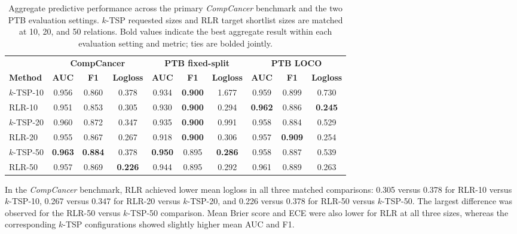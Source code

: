 \documentclass[preprint,12pt,a4paper]{elsarticle}
\begin{document}
\begin{table}[t]
\centering
\caption{Aggregate predictive performance across the primary \emph{CompCancer} benchmark and the two PTB evaluation settings. $k$-TSP requested sizes and RLR target shortlist sizes are matched at 10, 20, and 50 relations. Bold values indicate the best aggregate result within each evaluation setting and metric; ties are bolded jointly.}
\label{tab:world_performance}
\small
\setlength{\tabcolsep}{4pt}
\begin{adjustbox}{max width=\linewidth}
\begin{tabular}{lccc|ccc|ccc}
\toprule
& \multicolumn{3}{c|}{\textbf{CompCancer}}
& \multicolumn{3}{c|}{\textbf{PTB fixed-split}}
& \multicolumn{3}{c}{\textbf{PTB LOCO}} \\
\cmidrule(lr){2-4} \cmidrule(lr){5-7} \cmidrule(l){8-10}
\textbf{Method} & \textbf{AUC} & \textbf{F1} & \textbf{Logloss}
                & \textbf{AUC} & \textbf{F1} & \textbf{Logloss}
                & \textbf{AUC} & \textbf{F1} & \textbf{Logloss} \\
\midrule
$k$-TSP-10 & 0.956 & 0.860 & 0.378
           & 0.934 & \textbf{0.900} & 1.677
           & 0.959 & 0.899 & 0.730 \\

RLR-10     & 0.951 & 0.853 & 0.305
           & 0.930 & \textbf{0.900} & 0.294
           & \textbf{0.962} & 0.886 & \textbf{0.245} \\
\midrule
$k$-TSP-20 & 0.960 & 0.872 & 0.347
           & 0.935 & \textbf{0.900} & 0.991
           & 0.958 & 0.884 & 0.529 \\

RLR-20     & 0.955 & 0.867 & 0.267
           & 0.918 & \textbf{0.900} & 0.306
           & 0.957 & \textbf{0.909} & 0.254 \\
\midrule
$k$-TSP-50 & \textbf{0.963} & \textbf{0.884} & 0.378
           & \textbf{0.950} & 0.895 & \textbf{0.286}
           & 0.958 & 0.887 & 0.539 \\

RLR-50     & 0.957 & 0.869 & \textbf{0.226}
           & 0.944 & 0.895 & 0.292
           & 0.961 & 0.889 & 0.263 \\
\bottomrule
\end{tabular}
\end{adjustbox}
\end{table}

In the \emph{CompCancer} benchmark, RLR achieved lower mean logloss in all three matched comparisons: 0.305 versus 0.378 for RLR-10 versus $k$-TSP-10, 0.267 versus 0.347 for RLR-20 versus $k$-TSP-20, and 0.226 versus 0.378 for RLR-50 versus $k$-TSP-50. The largest difference was observed for the RLR-50 versus $k$-TSP-50 comparison. Mean Brier score and ECE were also lower for RLR at all three sizes, whereas the corresponding $k$-TSP configurations showed slightly higher mean AUC and F1.
\end{document}
